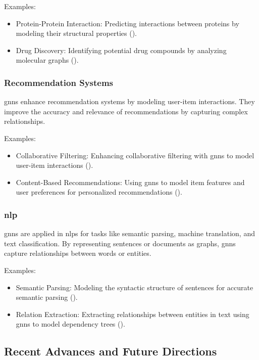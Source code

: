 Examples:
\begin{itemize}
    \item Protein-Protein Interaction: Predicting interactions between proteins by modeling their structural properties (\cite{Fout2017}).
    \item Drug Discovery: Identifying potential drug compounds by analyzing molecular graphs (\cite{Jin2018}).
\end{itemize}

\subsubsection*{Recommendation Systems}

\glspl{gnn} enhance recommendation systems by modeling user-item interactions. They improve the accuracy and relevance of recommendations by capturing complex relationships.

Examples:
\begin{itemize}
    \item Collaborative Filtering: Enhancing collaborative filtering with \glspl{gnn} to model user-item interactions (\cite{Wang2019}).
    \item Content-Based Recommendations: Using \glspl{gnn} to model item features and user preferences for personalized recommendations (\cite{Ying2018}).
\end{itemize}


\subsubsection*{\acrlong{nlp}}

\glspl{gnn} are applied in \glspl{nlp} for tasks like semantic parsing, machine translation, and text classification. By representing sentences or documents as graphs, \glspl{gnn} capture relationships between words or entities.

Examples:
\begin{itemize}
    \item Semantic Parsing: Modeling the syntactic structure of sentences for accurate semantic parsing (\cite{Zeng2019}).
    \item Relation Extraction: Extracting relationships between entities in text using \glspl{gnn} to model dependency trees (\cite{Sahu2019}).
\end{itemize}

\subsection*{Recent Advances and Future Directions}

